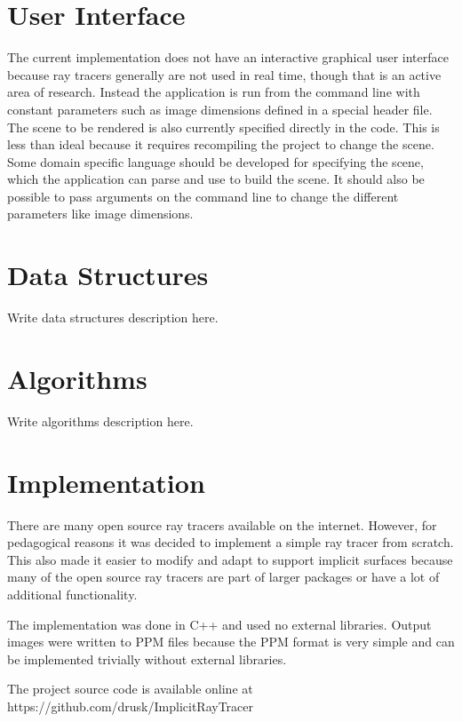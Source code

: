 \documentclass[conference]{acmsiggraph}
\begin{document}
\section{User Interface}

The current implementation does not have an interactive graphical user 
interface because ray tracers generally are not used in real time,
though that is an active area of research.  
Instead the application is run from the command line with constant 
parameters such as image dimensions defined in a special header file.
The scene to be rendered is also currently specified directly in the 
code.  This is less than ideal because it requires recompiling the project to 
change the scene.  Some domain specific language should be developed
for specifying the scene, which the application can parse and
use to build the scene.  It should also be possible to pass arguments
on the command line to change the different parameters like
image dimensions.

\section{Data Structures}

Write data structures description here.

\section{Algorithms}
\label{sec:Algorithms}

Write algorithms description here.

\section{Implementation}

There are many open source ray tracers available on the internet.  However, 
for pedagogical reasons it was decided to implement a simple ray tracer from 
scratch.  This also made it easier to modify and adapt to support implicit
surfaces because many of the open source ray tracers are part of larger 
packages or have a lot of additional functionality.

The implementation was done in C++ and used no external libraries.  Output 
images were written to PPM \cite{PPM} files because the PPM format is 
very simple and can be implemented trivially without external libraries.

The project source code is available online at 
https://github.com/drusk/ImplicitRayTracer
\end{document}
